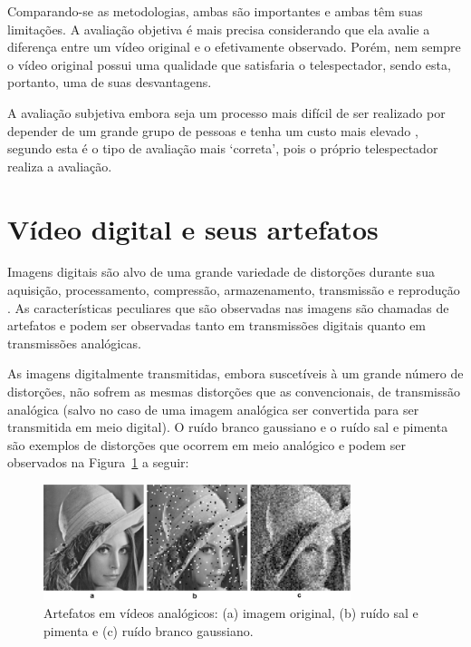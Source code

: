 Comparando-se as metodologias, ambas são importantes e ambas têm suas limitações. A avaliação objetiva é mais precisa considerando que ela avalie a diferença entre um vídeo original e o efetivamente observado. Porém, nem sempre o vídeo original possui uma qualidade que satisfaria o telespectador, sendo esta, portanto, uma de suas desvantagens.

A avaliação subjetiva embora seja um processo mais difícil de ser realizado por depender de um grande grupo de pessoas e tenha um custo mais elevado \cite{albini}, segundo \cite{wangbovik2004} esta é o tipo de avaliação mais ‘correta’, pois o próprio telespectador realiza a avaliação.

\section{Vídeo digital e seus artefatos}

Imagens digitais são alvo de uma grande variedade de distorções durante sua aquisição, processamento, compressão, armazenamento, transmissão e reprodução \cite{wangbovik2004}. As características peculiares que são observadas nas imagens são chamadas de artefatos \cite{albini} e podem ser observadas tanto em transmissões digitais quanto em transmissões analógicas.

As imagens digitalmente transmitidas, embora suscetíveis à um grande número de distorções, não sofrem as mesmas distorções que as convencionais, de transmissão analógica (salvo no caso de uma imagem analógica ser convertida para ser transmitida em meio digital). O ruído branco gaussiano e o ruído sal e pimenta são exemplos de distorções que ocorrem em meio analógico e podem ser observados na Figura~\ref{fig:artefatosanalogicos} a seguir:

\begin{figure}[!htb]
	\centering
	\includegraphics[width=0.8\textwidth]{./imgs/figura0.png}
	\caption{Artefatos em vídeos analógicos: (a) imagem original, (b) ruído sal e pimenta e (c) ruído branco gaussiano.}
	\label{fig:artefatosanalogicos}
\end{figure}

